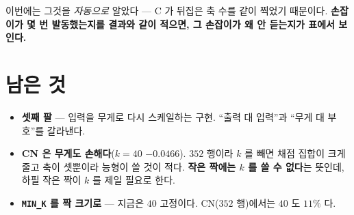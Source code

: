 \documentclass[11pt]{article}
\begin{document}
이번에는 그것을 \emph{자동으로} 알았다 --- C 가 뒤집은 축 수를 같이
찍었기 때문이다. \textbf{손잡이가 몇 번 발동했는지를 결과와 같이 적으면,
그 손잡이가 왜 안 듣는지가 표에서 보인다.}

\section*{남은 것}

\begin{itemize}
\item \textbf{셋째 팔} --- 입력을 무게로 다시 스케일하는 구현. ``출력 대
입력''과 ``무게 대 부호''를 갈라낸다.
\item \textbf{CN 은 무게도 손해다}($k{=}40$ $-0.0466$). $352$ 행이라 $k$ 를
빼면 채점 집합이 크게 줄고 축이 셋뿐이라 능형이 쓸 것이 적다.
\textbf{작은 짝에는 $k$ 를 쓸 수 없다}는 뜻인데, 하필 작은 짝이 $k$ 를
제일 필요로 한다.
\item \textbf{\texttt{MIN\_K} 를 짝 크기로} --- 지금은 $40$ 고정이다.
CN($352$ 행)에서는 $40$ 도 $11\%$ 다.
\end{itemize}
\end{document}

